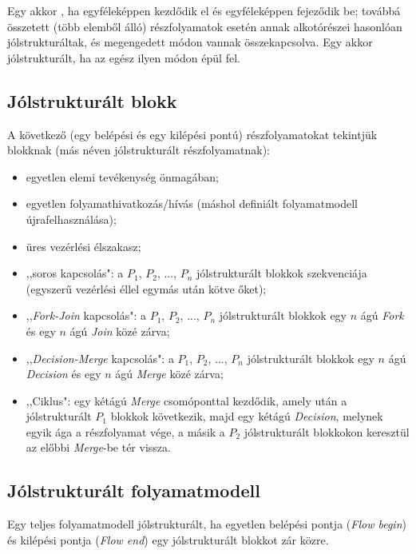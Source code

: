 \begin{definicio}
	Egy  akkor , ha egyféleképpen kezdődik el és egyféleképpen fejeződik be; továbbá összetett (több elemből álló) részfolyamatok esetén annak alkotórészei hasonlóan jólstrukturáltak, és megengedett módon vannak összekapcsolva. Egy  akkor jólstrukturált, ha az egész ilyen módon épül fel.
\end{definicio}

\subsection{Jólstrukturált blokk}

A következő (egy belépési és egy kilépési pontú) részfolyamatokat tekintjük  blokknak (más néven jólstrukturált részfolyamatnak):

\begin{itemize}
\item egyetlen elemi tevékenység önmagában;
\item egyetlen folyamathivatkozás/hívás (máshol definiált folyamatmodell újrafelhasználása);
\item üres vezérlési élszakasz;
\item ,,soros kapcsolás": a $P_1$, $P_2$, ..., $P_n$ jólstrukturált blokkok szekvenciája (egyszerű vezérlési éllel egymás után kötve őket);
\item ,,\emph{Fork-Join} kapcsolás": a $P_1$, $P_2$, ..., $P_n$ jólstrukturált blokkok egy $n$ ágú \emph{Fork} és egy $n$ ágú \emph{Join} közé zárva;
\item ,,\emph{Decision-Merge} kapcsolás": a $P_1$, $P_2$, ..., $P_n$ jólstrukturált blokkok egy $n$ ágú \emph{Decision} és egy $n$ ágú \emph{Merge} közé zárva;
\item ,,Ciklus": egy kétágú \emph{Merge} csomóponttal kezdődik, amely után a jólstrukturált $P_1$ blokkok következik, majd egy kétágú \emph{Decision}, melynek egyik ága a részfolyamat vége, a másik a $P_2$ jólstrukturált blokkokon keresztül az előbbi \emph{Merge}-be tér vissza.
\end{itemize}

\subsection{Jólstrukturált folyamatmodell}

Egy teljes folyamatmodell jólstrukturált, ha egyetlen belépési pontja (\emph{Flow begin}) és kilépési pontja (\emph{Flow end}) egy jólstrukturált blokkot zár közre.

